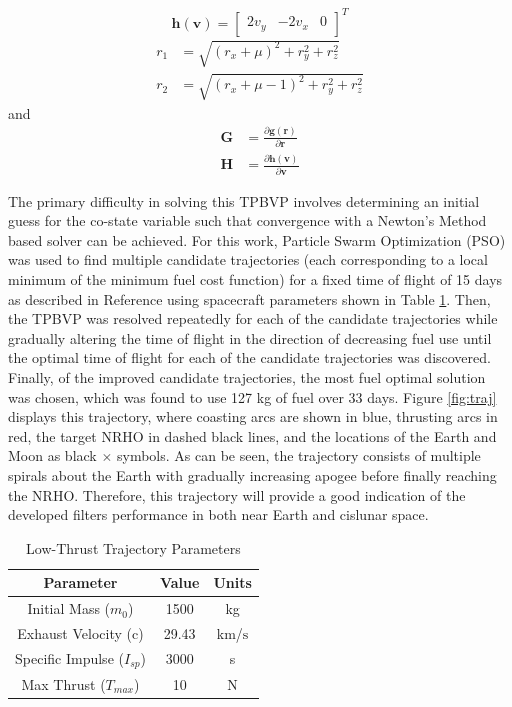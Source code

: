 \documentclass[letterpaper, paper,11pt]{AAS}		%
\begin{document}
\begin{equation}
	\mathbf{h}(\mathbf{v}) = \begin{bmatrix} 2v_y & -2v_x & 0 \end{bmatrix}^T
\end{equation}
\begin{align}
	r_1 &= \sqrt{(r_x + \mu)^2 + r_y^2 + r_z^2} \\
	r_2 &= \sqrt{(r_x + \mu - 1)^2 + r_y^2 + r_z^2}
\end{align}
and
\begin{align}
	\mathbf{G} &= \frac{\partial \mathbf{g}(\mathbf{r})}{\partial \mathbf{r}} \\
	\mathbf{H} &= \frac{\partial \mathbf{h}(\mathbf{v})}{\partial \mathbf{v}}
\end{align} 

The primary difficulty in solving this TPBVP involves determining an initial guess for the co-state variable such that convergence with a Newton's Method based solver can be achieved. For this work, Particle Swarm Optimization (PSO) was used to find multiple candidate trajectories (each corresponding to a local minimum of the minimum fuel cost function) for a fixed time of flight of 15 days as described in Reference  using spacecraft parameters shown in Table \ref{tab:traj_params}. Then, the TPBVP was resolved repeatedly for each of the candidate trajectories while gradually altering the time of flight in the direction of decreasing fuel use until the optimal time of flight for each of the candidate trajectories was discovered. Finally, of the improved candidate trajectories, the most fuel optimal solution was chosen, which was found to use 127 kg of fuel over 33 days. Figure \ref{fig:traj} displays this trajectory, where coasting arcs are shown in blue, thrusting arcs in red, the target NRHO in dashed black lines, and the locations of the Earth and Moon as black $\times$ symbols. As can be seen, the trajectory consists of multiple spirals about the Earth with gradually increasing apogee before finally reaching the NRHO. Therefore, this trajectory will provide a good indication of the developed filters performance in both near Earth and cislunar space.  

\begin{table}[]
	\centering
	\caption{Low-Thrust Trajectory Parameters}
	\label{tab:traj_params}
	\begin{tabular}{ccc}
		\hline
		\hline
		Parameter             		 & Value        & Units         \\ 
		\hline
		Initial Mass ($m_0$) 		 & 1500 		& kg            \\
		Exhaust Velocity (c) 		 & 29.43        & km/$\text{s}$  \\
		Specific Impulse ($I_{sp}$)  & 3000  		& s             \\
		Max Thrust ($T_{max}$)       & 10  		 	& N             \\
		\hline \hline
	\end{tabular}
\end{table}
\end{document}
